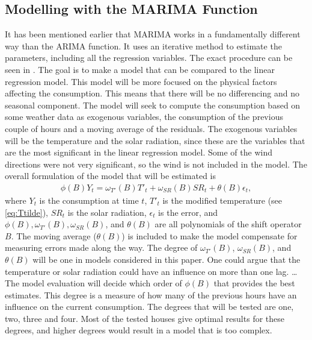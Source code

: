\subsection{Modelling with the MARIMA Function}
It has been mentioned earlier that MARIMA works in a fundamentally different way than the ARIMA function. It uses an iterative method to estimate the parameters, including all the regression variables. The exact procedure can be seen in \cite{marima}. The goal is to make a model that can be compared to the linear regression model. This model will be more focused on the physical factors affecting the consumption. This means that there will be no differencing and no seasonal component. The model will seek to compute the consumption based on some weather data as exogenous variables, the consumption of the previous couple of hours and a moving average of the residuals. The exogenous variables will be the temperature and the solar radiation, since these are the variables that are the most significant in the linear regression model. Some of the wind directions were not very significant, so the wind is not included in the model. The overall formulation of the model that will be estimated is
\begin{align}
    \phi (B) Y_t =  \omega_{T'}(B)T'_t + \omega_{SR}(B)SR_t + \theta (B) \epsilon_t,
    \label{eq:MARIMA1}
\end{align}
where $Y_t$ is the consumption at time $t$, $T'_t$ is the modified temperature (see \cref{eq:Ttilde}), $SR_t$ is the solar radiation, $\epsilon_t$ is the error, and $\phi(B), \omega_{T'}(B), \omega_{SR}(B)$, and $\theta(B)$ are all polynomials of the shift operator $B$. The moving average ($\theta(B)$) is included to make the model compensate for measuring errors made along the way. The degree of $\omega_{T'}(B)$, $\omega_{SR}(B)$, and $\theta(B)$ will be one in models considered in this paper. One could argue that the temperature or solar radiation could have an influence on more than one lag. \dots The model evaluation will decide which order of $\phi(B)$ that provides the best estimates. This degree is a measure of how many of the previous hours have an influence on the current consumption. The degrees that will be tested are one, two, three and four. Most of the tested houses give optimal results for these degrees, and higher degrees would result in a model that is too complex.

